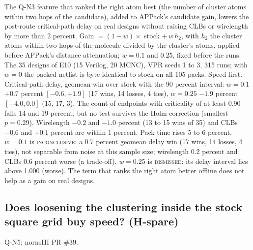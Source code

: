  The Q-N3 feature that ranked the right atom best (the number of cluster atoms within two hops of the candidate), added to APPack's candidate gain, lowers the post-route critical-path delay on real designs without raising CLBs or wirelength by more than 2 percent. %
 Gain $=(1-w)\times$ stock $+\,w\,h_2$, with $h_2$ the cluster atoms within two hops of the molecule divided by the cluster's atoms, applied before APPack's distance attenuation; $w=0.1$ and $0.25$, fixed before the runs. The 35 designs of E10 (15 Verilog, 20 MCNC), VPR seeds 1 to 3, 315 runs; with $w=0$ the packed netlist is byte-identical to stock on all 105 packs.
 Speed first. Critical-path delay, geomean win over stock with the 90 percent interval: $w=0.1$ $+0.7$ percent $[-0.6,+1.9]$ (17 wins, 14 losses, 4 ties), $w=0.25$ $-1.9$ percent $[-4.0,0.0]$ (15, 17, 3). The count of endpoints with criticality of at least 0.90 falls 14 and 19 percent, but no test survives the Holm correction (smallest $p=0.29$). Wirelength $-0.2$ and $-1.0$ percent (13 to 15 wins of 35) and CLBs $-0.6$ and $+0.1$ percent are within 1 percent. Pack time rises 5 to 6 percent.
 $w=0.1$ is \textsc{inconclusive}: a 0.7 percent geomean delay win (17 wins, 14 losses, 4 ties), not separable from noise at this sample size; wirelength 0.2 percent and CLBs 0.6 percent worse (a trade-off). $w=0.25$ is \textsc{dismissed}: its delay interval lies above 1.000 (worse). The term that ranks the right atom better offline does not help as a gain on real designs.

\subsection{Does loosening the clustering inside the stock square grid buy speed? (H-spare)}
\label{sec:e-spare}

 Q-N5; nornsIII PR \#39.

